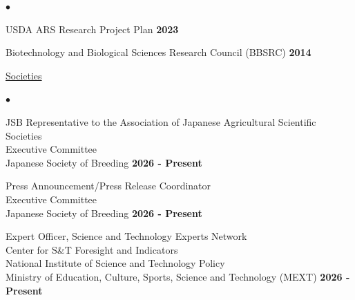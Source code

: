 \documentclass[margin,line,10pt]{res}
\newenvironment{list2}{
  \begin{list}{$\bullet$}{%
      \setlength{\itemsep}{0in}
      \setlength{\parsep}{0in} \setlength{\parskip}{0in}
      \setlength{\topsep}{0in} \setlength{\partopsep}{0in} 
      \setlength{\leftmargin}{0.2in}}}{\end{list}}
\begin{document}
\begin{resume}
\begin{list2}

  \item USDA ARS Research Project Plan \hfill \textbf{2023}  \\

  \vspace{0.3cm}

\item  Biotechnology and Biological Sciences Research Council (BBSRC) \hfill \textbf{2014}  \\
\end{list2}






\begin{flushleft}
  \hspace{0.3cm} \underline{Societies}
\end{flushleft}
\begin{list2}

  \item JSB Representative to the Association of Japanese Agricultural Scientific Societies \\ %
  Executive Committee \\
  Japanese Society of Breeding \hfill \textbf{2026 - Present}

  \vspace{0.3cm}

  \item Press Announcement/Press Release Coordinator \\ %
  Executive Committee \\
  Japanese Society of Breeding \hfill \textbf{2026 - Present}

  \vspace{0.3cm}



\item  Expert Officer, Science and Technology Experts Network \\ %
Center for S\&T Foresight and Indicators \\
National Institute of Science and Technology Policy \\
Ministry of Education, Culture, Sports, Science and Technology (MEXT) \hfill \textbf{2026 - Present}



\end{list2}
\end{resume}
\end{document}
